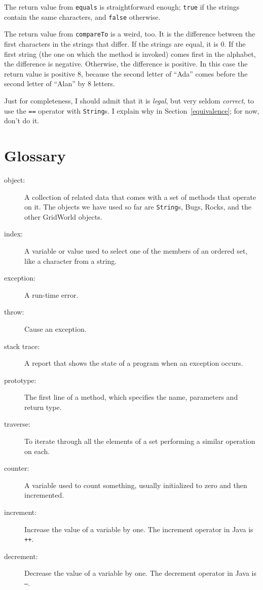 \documentclass[12pt]{book}
\theoremstyle{exercise}
\begin{document}
The return value from {\tt equals} is straightforward enough;
{\tt true} if the strings contain the same characters, and
{\tt false} otherwise.

The return value from {\tt compareTo} is a weird, too.  It is
the difference between the first characters in the strings
that differ.  If the strings are equal, it is 0.  If the
first string (the one on which the method is invoked) comes
first in the alphabet, the difference is negative.  Otherwise,
the difference is positive.  In this case the return value
is positive 8, because the second letter of ``Ada'' comes
before the second letter of ``Alan'' by 8 letters.

Just for completeness, I should admit that it is {\em legal}, but very
seldom {\em correct}, to use the {\tt ==} operator with {\tt String}s.
I explain why in Section~\ref{equivalence}; for now, don't do it.


\section{Glossary}

\begin{description}

\item[object:] A collection of related data that comes with a set of
methods that operate on it.  The objects we have used so far are
{\tt String}s, Bugs, Rocks, and the other GridWorld objects.

\item[index:]  A variable or value used to select one of the
members of an ordered set, like a character from a string.

\item[exception:] A run-time error.

\item[throw:] Cause an exception.

\item[stack trace:] A report that shows the state of a program
when an exception occurs.

\item[prototype:]  The first line of a method, which specifies
the name, parameters and return type.

\item[traverse:]  To iterate through all the elements of a set
performing a similar operation on each.

\item[counter:]  A variable used to count something, usually
initialized to zero and then incremented.

\item[increment:]  Increase the value of a variable by one.
The increment operator in Java is {\tt ++}.

\item[decrement:]  Decrease the value of a variable by one.
The decrement operator in Java is {\tt --}.



\end{description}
\end{document}
